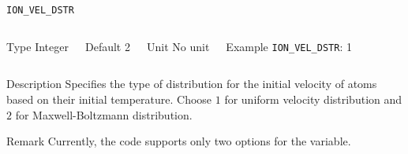 





\begin{frame}[allowframebreaks]{\texttt{ION\_VEL\_DSTR}} \label{ION_VEL_DSTR}
\vspace*{-12pt}
\begin{columns}
\begin{block}{Type}
Integer
\end{block}

\begin{block}{Default}
2
\end{block}

\begin{block}{Unit}
No unit
\end{block}

\begin{block}{Example}
\texttt{ION\_VEL\_DSTR}: 1
\end{block}
\end{columns}

\begin{block}{Description}
Specifies the type of distribution for the initial velocity of atoms based on their initial temperature. Choose $1$ for uniform velocity distribution and $2$ for Maxwell-Boltzmann distribution.
\end{block}

\begin{block}{Remark}
Currently, the code supports only two options for the variable.
\end{block}

\end{frame}


